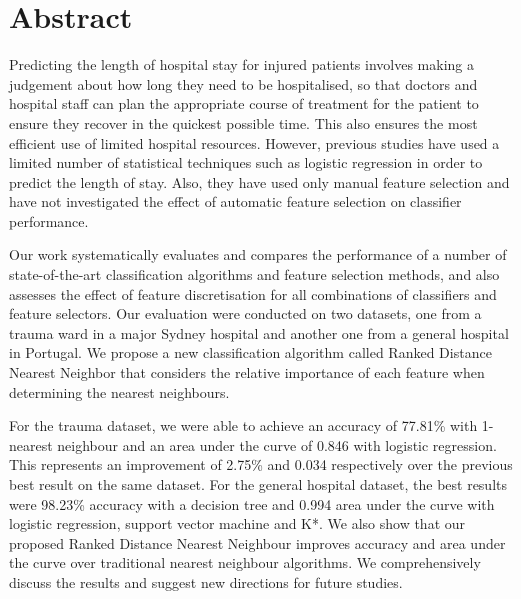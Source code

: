 \chapter*{Abstract}

Predicting the length of hospital stay for injured patients involves making a
judgement about how long they need to be hospitalised, so that doctors and
hospital staff can plan the appropriate course of treatment for the patient
to ensure they recover in the quickest possible time. This also ensures the
most efficient use of limited hospital resources. However, previous studies
have used a limited number of statistical techniques such as logistic
regression in order to predict the length of stay. Also, they have used only
manual feature selection and have not investigated the effect of automatic
feature selection on classifier performance.

Our work systematically evaluates and compares the performance of a number of
state-of-the-art classification algorithms and feature selection methods,
and also assesses the effect of feature discretisation for all combinations
of classifiers and feature selectors. Our evaluation were conducted on two
datasets, one from a trauma ward in a major Sydney hospital and another one
from a general hospital in Portugal. We propose a new classification algorithm
called Ranked Distance Nearest Neighbor that considers the
relative importance of each feature when determining the nearest neighbours.

For the trauma dataset, we were able to achieve an accuracy of 77.81\% with
1-nearest neighbour and an area under the curve of 0.846 with logistic
regression. This represents an improvement of 2.75\% and 0.034 respectively
over the previous best result on the same dataset. For the
general hospital dataset, the best results were 98.23\% accuracy with a
decision tree and 0.994 area under the curve with logistic regression,
support vector machine and K*. We also show that our proposed Ranked
Distance Nearest Neighbour improves accuracy and area under the curve over
traditional nearest neighbour algorithms. We comprehensively discuss
the results and suggest new directions for future studies.
